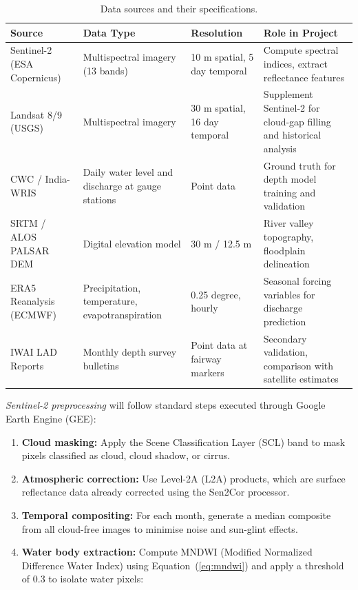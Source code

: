 \documentclass[12pt,a4paper]{article}
\begin{document}
\begin{table}[H]
\centering
\caption{Data sources and their specifications.}
\label{tab:data_sources}
\begin{tabular}{p{3.2cm} p{3.5cm} p{2.5cm} p{3.5cm}}
\toprule
\textbf{Source} & \textbf{Data Type} & \textbf{Resolution} & \textbf{Role in Project} \\
\midrule
Sentinel-2 (ESA Copernicus) & Multispectral imagery (13 bands) & 10 m spatial, 5 day temporal & Compute spectral indices, extract reflectance features \\
\addlinespace
Landsat 8/9 (USGS) & Multispectral imagery & 30 m spatial, 16 day temporal & Supplement Sentinel-2 for cloud-gap filling and historical analysis \\
\addlinespace
CWC / India-WRIS & Daily water level and discharge at gauge stations & Point data & Ground truth for depth model training and validation \\
\addlinespace
SRTM / ALOS PALSAR DEM & Digital elevation model & 30 m / 12.5 m & River valley topography, floodplain delineation \\
\addlinespace
ERA5 Reanalysis (ECMWF) & Precipitation, temperature, evapotranspiration & 0.25 degree, hourly & Seasonal forcing variables for discharge prediction \\
\addlinespace
IWAI LAD Reports & Monthly depth survey bulletins & Point data at fairway markers & Secondary validation, comparison with satellite estimates \\
\bottomrule
\end{tabular}
\end{table}

\textit{Sentinel-2 preprocessing} will follow standard steps executed through Google Earth Engine (GEE):

\begin{enumerate}[leftmargin=1.5cm]
\item \textbf{Cloud masking:} Apply the Scene Classification Layer (SCL) band to mask pixels classified as cloud, cloud shadow, or cirrus.
\item \textbf{Atmospheric correction:} Use Level-2A (L2A) products, which are surface reflectance data already corrected using the Sen2Cor processor.
\item \textbf{Temporal compositing:} For each month, generate a median composite from all cloud-free images to minimise noise and sun-glint effects.
\item \textbf{Water body extraction:} Compute MNDWI (Modified Normalized Difference Water Index) using Equation~(\ref{eq:mndwi}) and apply a threshold of 0.3 to isolate water pixels:
\end{enumerate}
\end{document}
